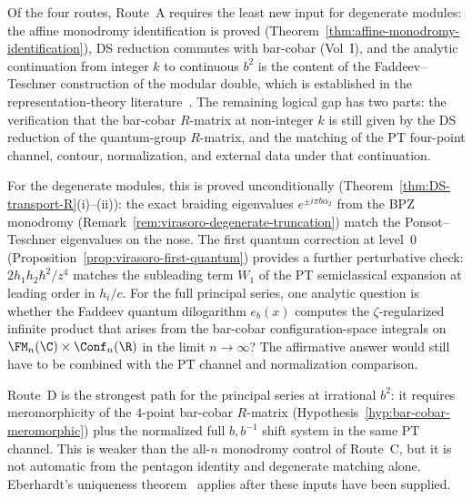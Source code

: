 \begin{remark}
\label{rem:strongest-route}
Of the four routes, Route~A requires the least new input for
degenerate modules: the affine monodromy identification is proved
(Theorem~\ref{thm:affine-monodromy-identification}), DS reduction
commutes with bar-cobar (Vol~I), and the analytic continuation
from integer $k$ to continuous $b^2$ is the content of the
Faddeev--Teschner construction of the modular double, which is
established in the representation-theory
literature~\cite{Faddeev99, PT01, TeschnerLiouville}. The
remaining logical gap has two parts: the verification that the
bar-cobar $R$-matrix at non-integer $k$ is still given by the DS
reduction of the quantum-group $R$-matrix, and the matching of the PT
four-point channel, contour, normalization, and external data under
that continuation.

For the degenerate modules, this is proved unconditionally
(Theorem~\ref{thm:DS-transport-R}(i)--(ii)): the exact braiding
eigenvalues $e^{\pm i\pi b\alpha_2}$ from the BPZ monodromy
(Remark~\ref{rem:virasoro-degenerate-truncation}) match the
Ponsot--Teschner eigenvalues on the nose. The first quantum
correction at level~$0$
(Proposition~\ref{prop:virasoro-first-quantum}) provides a
further perturbative check: $2h_1 h_2\hbar^2/z^4$ matches the
subleading term $W_1$ of the PT semiclassical expansion at
leading order in $h_i/c$. For the full
principal series, one analytic question is whether the Faddeev quantum
dilogarithm $e_b(x)$ computes the
$\zeta$-regularized infinite product that arises from the
bar-cobar configuration-space integrals on
$\FM_n(\C) \times \Conf_n(\R)$ in the limit $n \to \infty$?
The affirmative answer would still have to be combined with the PT
channel and normalization comparison.

Route~D is the strongest path for the principal series at
irrational $b^2$: it requires meromorphicity of the $4$-point
bar-cobar $R$-matrix
(Hypothesis~\ref{hyp:bar-cobar-meromorphic}) plus the normalized full
$b,b^{-1}$ shift system in the same PT channel. This is weaker than
the all-$n$ monodromy control of Route~C, but it is not automatic from
the pentagon identity and degenerate matching alone. Eberhardt's
uniqueness theorem~\cite{Eberhardt23} applies after these inputs have
been supplied.
\end{remark}

